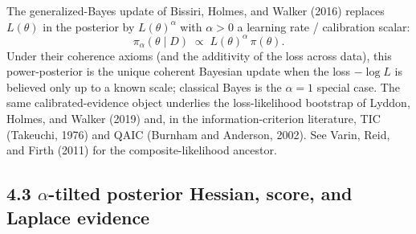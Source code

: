\documentclass[11pt]{article}
\begin{document}
The generalized-Bayes update of Bissiri, Holmes, and Walker (2016) replaces
$L(\theta)$ in the posterior by $L(\theta)^\alpha$ with $\alpha > 0$ a learning
rate / calibration scalar:
\begin{equation}
\pi_\alpha(\theta\mid D)
\;\propto\;
L(\theta)^\alpha\,\pi(\theta).
\label{eq:power-posterior}
\end{equation}
Under their coherence axioms (and the additivity of the loss across data), this
power-posterior is the unique coherent Bayesian update when the loss $-\log L$
is believed only up to a known scale; classical Bayes is the $\alpha = 1$
special case. The same calibrated-evidence object underlies the loss-likelihood
bootstrap of Lyddon, Holmes, and Walker (2019) and, in the information-criterion
literature, TIC (Takeuchi, 1976) and QAIC (Burnham and Anderson, 2002). See
Varin, Reid, and Firth (2011) for the composite-likelihood ancestor.

\subsection*{4.3 $\alpha$-tilted posterior Hessian, score, and Laplace evidence}
\end{document}
